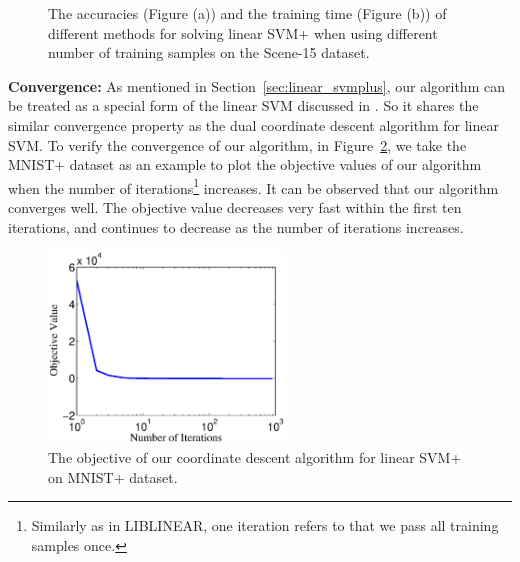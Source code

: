 \begin{figure}
\centering
{}
\caption{The accuracies (Figure (a)) and the training time (Figure (b)) of different methods for solving linear SVM+ when using different number of training samples on the Scene-15 dataset.}
\label{svm:fig:linear}
\end{figure}

\noindent\textbf{Convergence:} As mentioned in
Section~\ref{sec:linear_svmplus}, our algorithm can be treated as a
special form of the linear SVM discussed in \citep{DCD_linearsvm}. So
it shares the similar convergence property as the dual coordinate
descent algorithm for linear SVM. To verify the convergence of our
algorithm, in Figure~\ref{svm:fig:mnist_obj}, we take the MNIST+ dataset
as an example to plot the objective values of our algorithm when the
number of iterations\footnote{Similarly as in LIBLINEAR, one iteration
  refers to that we pass all training samples once.} increases. It can
be observed that our algorithm converges well. The objective value
decreases very fast within the first ten iterations, and continues to
decrease as the number of iterations increases.
\begin{figure}
\centering
\includegraphics[width=0.56\textwidth]{./svmplus/obj_mnist.eps}
\caption{The objective of our coordinate descent algorithm for linear SVM+ on MNIST+ dataset.}
\label{svm:fig:mnist_obj}
\end{figure}


